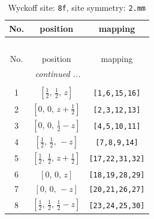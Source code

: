 \documentclass[fleqn,8pt]{jsarticle}
\begin{document}
\begin{longtable}{ccc}
\caption{Wyckoff site: {\tt 8f}, site symmetry: {\tt 2.mm}}
 \\
 \hline \hline
No. & position & mapping \\ \hline \endfirsthead

\multicolumn{2}{l}{\tablename\ \thetable{}} \\
 \hline \hline
No. & position & mapping \\ \hline \endhead

 \hline \hline
\multicolumn{2}{r}{\footnotesize\it continued ...} \\ \endfoot

 \hline \hline
\multicolumn{2}{r}{} \\ \endlastfoot

1 & $\left[ \frac{1}{2},\, \frac{1}{2},\, z \right]$ & {\tt [1,6,15,16]} \\ \hline
2 & $\left[ 0,\, 0,\, z + \frac{1}{2} \right]$ & {\tt [2,3,12,13]} \\ \hline
3 & $\left[ 0,\, 0,\, \frac{1}{2} - z \right]$ & {\tt [4,5,10,11]} \\ \hline
4 & $\left[ \frac{1}{2},\, \frac{1}{2},\, - z \right]$ & {\tt [7,8,9,14]} \\ \hline
5 & $\left[ \frac{1}{2},\, \frac{1}{2},\, z + \frac{1}{2} \right]$ & {\tt [17,22,31,32]} \\ \hline
6 & $\left[ 0,\, 0,\, z \right]$ & {\tt [18,19,28,29]} \\ \hline
7 & $\left[ 0,\, 0,\, - z \right]$ & {\tt [20,21,26,27]} \\ \hline
8 & $\left[ \frac{1}{2},\, \frac{1}{2},\, \frac{1}{2} - z \right]$ & {\tt [23,24,25,30]} \\
\end{longtable}
\renewcommand{\arraystretch}{1.2}
\end{document}
